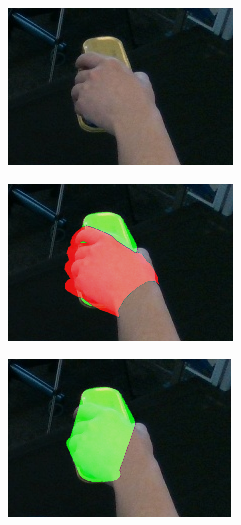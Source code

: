 \DIFaddbegin \begin{figure}[h!]
    \begin{subfigure}[b]{0.32\linewidth}
        \includegraphics[width=0.98\linewidth]{figs/20020_rgb}
        \caption{}
    \end{subfigure}
    \begin{subfigure}[b]{0.32\linewidth}
        \includegraphics[width=0.98\linewidth]{figs/20020_withhand}
        \caption{}
    \end{subfigure}
    \begin{subfigure}[b]{0.32\linewidth}
        \includegraphics[width=0.98\linewidth]{figs/20020_nohand}

\end{subfigure}
\end{figure}
